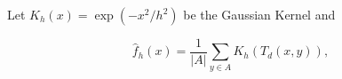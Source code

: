 Let  $K_h(x) = \exp( -x^2/h^2)$ be the Gaussian Kernel and

\[
    \hat{f}_h(x) = \frac{1}{|A|}\sum_{ y \in A} K_h (T_d(x,y)),
  \]